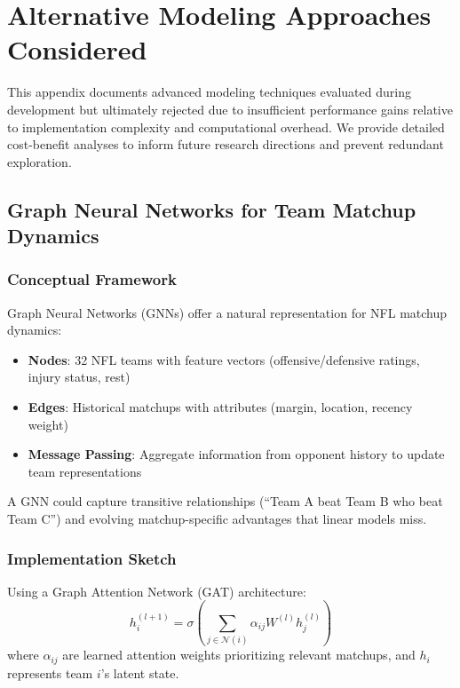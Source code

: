 \chapter{Alternative Modeling Approaches Considered}
\label{app:alternative-approaches}

This appendix documents advanced modeling techniques evaluated during development but ultimately rejected due to insufficient performance gains relative to implementation complexity and computational overhead. We provide detailed cost-benefit analyses to inform future research directions and prevent redundant exploration.

\section{Graph Neural Networks for Team Matchup Dynamics}

\subsection{Conceptual Framework}
Graph Neural Networks (GNNs) offer a natural representation for NFL matchup dynamics:
\begin{itemize}
  \item \textbf{Nodes}: 32 NFL teams with feature vectors (offensive/defensive ratings, injury status, rest)
  \item \textbf{Edges}: Historical matchups with attributes (margin, location, recency weight)
  \item \textbf{Message Passing}: Aggregate information from opponent history to update team representations
\end{itemize}

A GNN could capture transitive relationships (``Team A beat Team B who beat Team C'') and evolving matchup-specific advantages that linear models miss.

\subsection{Implementation Sketch}
Using a Graph Attention Network (GAT) architecture:
\begin{equation}
h_i^{(l+1)} = \sigma\left(\sum_{j \in \mathcal{N}(i)} \alpha_{ij} W^{(l)} h_j^{(l)}\right)
\end{equation}
where $\alpha_{ij}$ are learned attention weights prioritizing relevant matchups, and $h_i$ represents team $i$'s latent state.

